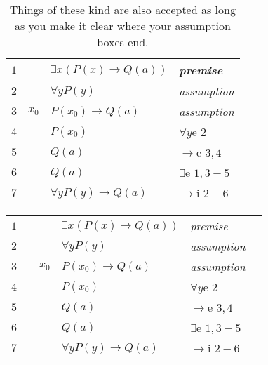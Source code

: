 \documentclass[12pt]{article}                       %
\begin{document}
\begin{table}[H]
	\centering
	\caption{Things of these kind are also accepted as long as you make it clear where your assumption boxes end.}
	\begin{tabular}{*4{l}}
		$1$ & & $\exists x (P(x) \rightarrow Q(a))$ & \textit{premise} \\ \hline \hline     %
		
		$2$ & & $\forall y P(y)$ &\textit{assumption} \\ \hline                             %
		
		$3$ & $x_0$ & $P(x_0) \rightarrow Q(a)$ &\textit{assumption}\\ 
		
		$4$ & & $P(x_0)$ &$\forall y$e $2$\\
		
		$5$ & & $Q(a)$ & $\rightarrow$e $3,4$\\ \hline                                      %
		                                                                                                                     
		$6$ & & $Q(a)$ & $\exists$e $1,3-5$ \\  \hline \hline                               %
		
		$7$ & & $\forall y P(y) \rightarrow Q(a)$ & $\rightarrow$i $2-6$ \\
		
	\end{tabular}
\end{table}
\vspace{20px}
\begin{table}[H]
    \centering
	\begin{tabular}{*6{l}}
	$1$ & & & $\exists x (P(x) \rightarrow Q(a))$ & \textit{premise} & \\ \cline{2-6}
	
	$2$ & & & $\forall y P(y)$ &\textit{assumption} & \\ \cline{3-5}
	
	$3$ & & $x_0$ & $P(x_0) \rightarrow Q(a)$ &\textit{assumption}& \\ 
	
	$4$ & & & $P(x_0)$ &$\forall y$e $2$&\\
	
	$5$ & & & $Q(a)$ & $\rightarrow$e $3,4$&\\ \cline{3-5}
	
	$6$ & & & $Q(a)$ & $\exists$e $1,3-5$ & \\ \cline{2-6}
	
	$7$ & & & $\forall y P(y) \rightarrow Q(a)$ & $\rightarrow$i $2-6$ & \\
\end{tabular}
\end{table}
\end{document}
